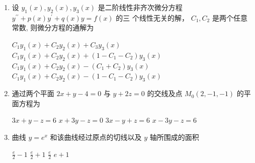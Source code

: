 \begin{enumerate}
\begin{enumerate}
	

\fourchoices
{$(-d, d)$}
{$[-d, d)$}
{$(-1,1)$}
{$[-1,1)$}


\item 
设 $y_{1}(x), y_{2}(x), y_{3}(x)$ 是二阶线性非齐次微分方程 $y^{\prime \prime}+p(x) y^{\prime}+q(x) y=f(x)$ 的三 个线性无关的解， $C_{1}, C_{2}$ 是两个任意常数, 则微分方程的通解为  

\fourchoices
{$C_{1} y_{1}(x)+C_{2} y_{2}(x)+C_{3} y_{3}(x)$}
{$C_{1} y_{1}(x)+C_{2} y_{2}(x)+\left(1-C_{1}-C_{2}\right) y_{3}(x)$}
{$C_{1} y_{1}(x)+C_{2} y_{2}(x)-\left(C_{1}+C_{2}\right) y_{3}(x)$}
{$C_{1} y_{1}(x)+C_{2} y_{2}(x)-\left(1-C_{1}-C_{2}\right) y_{3}(x)$}

\item 
通过两个平面 $2 x+y-4=0$ 与 $y+2 z=0$ 的交线及点 $M_{0}(2,-1,-1)$ 的平面方程为  


\fourchoices
{$3 x+y-z=6$}
{$x+3 y-z=0$}
{$3 x-y+z=6$}
{$x-3 y-z=6$}

\item 
曲线 $y=e^{x}$ 和该曲线经过原点的切线以及 $y$ 轴所围成的面积  


\fourchoices
{$\frac{e}{2}-1$}
{$\frac{e}{2}+1$}
{$\frac{e}{2}$}
{$e+1$}



\end{enumerate}


\end{enumerate}
